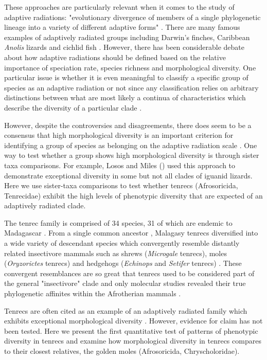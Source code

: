 \documentclass[12pt,a4paper]{article}
\begin{document}
	These approaches are particularly relevant when it comes to the study of adaptive radiations: "evolutionary divergence of members of a single phylogenetic lineage into a variety of different adaptive forms" \citep[Futuyma 1998, cited by][]{Losos2010}. 
	There are many famous examples of adaptively radiated groups including Darwin's finches, Caribbean \textit{Anolis} lizards and cichlid fish \citep{Gavrilets2009}. However, there has been considerable debate about how adaptive radiations should be defined \citep{Glor2010, Losos2010a} based on the relative importance of speciation rate, species richness and morphological diversity. One particular issue is whether it is even meaningful to classify a specific group of species as an adaptive radiation or not since any classification relies on arbitrary distinctions between what are most likely a continua of characteristics which describe the diversity of a particular clade \citep{Olson2009}.

	However, despite the controversies and disagreements, there does seem to be a consensus that high morphological diversity is an important criterion for identifying a group of species as belonging on the adaptive radiation scale \citep{Losos2010a, Olson2009}. One way to test whether a group shows high morphological diversity is through sister taxa comparisons. For example, Losos and Miles (\citeyear{Losos2002}) used this approach to demonstrate exceptional diversity in some but not all clades of iguanid lizards.
	Here we use sister-taxa comparisons to test whether tenrecs (Afrosoricida, Tenrecidae) exhibit the high levels of phenotypic diversity that are expected of an adaptively radiated clade.

	The tenrec family is comprised of 34 species, 31 of which are endemic to Madagascar \citep{Olson2013}. From a single common ancestor \citep{Asher2006}, Malagasy tenrecs diversified into a wide variety of descendant species which convergently resemble distantly related insectivore mammals such as shrews (\textit{Microgale} tenrecs), moles (\textit{Oryzorictes} tenrecs) and hedgehogs (\textit{Echinops} and \textit{Setifer} tenrecs) \citep{Eisenberg1969}. These convergent resemblances are so great that tenrecs used to be considered part of the general "insectivore" clade and only molecular studies revealed their true phylogenetic affinites within the Afrotherian mammals \citep{Stanhope1998}.  

	Tenrecs are often cited as an example of an adaptively radiated family which exhibits exceptional morphological diversity \citep{Soarimalala2011, Olson2003, Eisenberg1969}. However, evidence for claim has not been tested. Here we present the first quantitative test of patterns of phenotypic diversity in tenrecs and examine how morphological diversity in tenrecs compares to their closest relatives, the golden moles (Afrosoricida, Chryscholoridae). 
\end{document}
